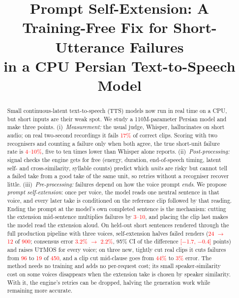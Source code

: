 \documentclass[conference]{IEEEtran}
\newcommand{\RES}[1]{\textcolor{red}{#1}}
\begin{document}
\title{Prompt Self-Extension: A Training-Free Fix for Short-Utterance Failures\\
in a CPU Persian Text-to-Speech Model}

\author{
}

\maketitle

\begin{abstract}
Small continuous-latent text-to-speech (TTS) models now run in real time on a CPU, but short inputs are their
weak spot. We study a 110M-parameter Persian model and make three points. (i)~\emph{Measurement:} the usual
judge, Whisper, hallucinates on short audio; on real two-second recordings it fails \RES{17\%} of correct
clips. Scoring with two recognisers and counting a failure only when both agree, the true short-unit failure
rate is \RES{4--10\%}, five to ten times lower than Whisper alone reports. (ii)~\emph{Post-processing:}
signal checks the engine gets for free (energy, duration, end-of-speech timing, latent self- and
cross-similarity, syllable counts) predict which \emph{units} are risky but cannot tell a failed take from a
good take of the same unit, so retries without a recogniser recover little. (iii)~\emph{Pre-processing:}
failures depend on how the voice prompt \emph{ends}. We propose \emph{prompt self-extension}: once per
voice, the model reads one neutral sentence in that voice, and every later take is conditioned on the
reference clip followed by that reading. Ending the prompt at the model's own completed sentence is the
mechanism: cutting the extension mid-sentence multiplies failures by \RES{3--10}, and placing the clip last
makes the model read the extension aloud. On held-out short sentences rendered through the full production
pipeline with three voices, self-extension halves failed renders (\RES{24 $\to$ 12} of \RES{900}; consensus
error \RES{3.2\% $\to$ 2.2\%}, 95\% CI of the difference \RES{[$-$1.7, $-$0.4]} points) and raises UTMOS for
every voice; on three new, tightly cut real clips it cuts failures from \RES{96} to \RES{19} of \RES{450},
and a clip cut mid-clause goes from \RES{44\%} to \RES{3\%} error. The method needs no training and adds no per-request cost; its small
speaker-similarity cost on some voices disappears when the extension take is chosen by speaker similarity.
With it, the engine's retries can be dropped, halving the generation work while remaining more accurate.
\end{abstract}
\end{document}
